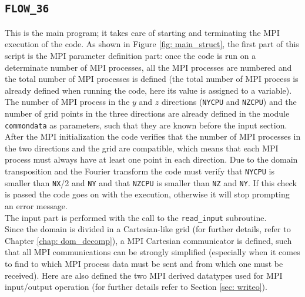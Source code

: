 \subsection{\texttt{FLOW\_36}}
This is the main program; it takes care of starting and terminating the MPI execution of the code. As shown in Figure \ref{fig: main_struct}, the first part of this script is the MPI parameter definition part: once the code is run on a determinate number of MPI processes, all the MPI processes are numbered and the total number of MPI processes is defined (the total number of MPI process is already defined when running the code, here its value is assigned to a variable). The number of MPI process in the $y$ and $z$ directions (\texttt{NYCPU} and \texttt{NZCPU}) and the number of grid points in the three directions are already defined in the module \texttt{commondata} as parameters, such that they are known before the input section. After the MPI initialization the code verifies that the number of MPI processes in the two directions and the grid are compatible, which means that each MPI process must always have at least one point in each direction. Due to the domain transposition and the Fourier transform the code must verify that \texttt{NYCPU} is smaller than \texttt{NX}/2 and \texttt{NY} and that \texttt{NZCPU} is smaller than \texttt{NZ} and \texttt{NY}. If this check is passed the code goes on with the execution, otherwise it will stop prompting an error message.\\
The input part is performed with the call to the \texttt{read\_input} subroutine.\\
Since the domain is divided in a Cartesian-like grid (for further details, refer to Chapter \ref{chap: dom_decomp}), a MPI Cartesian communicator is defined, such that all MPI communications can be strongly simplified (especially when it comes to find to which MPI process data must be sent and from which one must be received). Here are also defined the two MPI derived datatypes used for MPI input/output operation (for further details refer to Section \ref{sec: writeo}).\\
\def\arraystretch{0.4}

